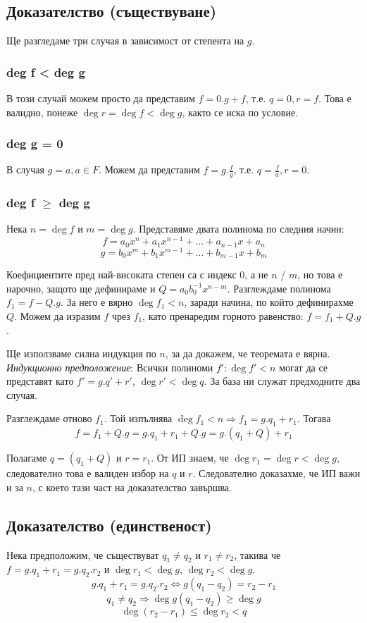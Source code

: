 \documentclass[fleqn,12pt]{article}
\begin{document}
\subsection{Доказателство (съществуване)}
Ще разгледаме три случая в зависимост от степента на $g$.

\subsubsection{deg f < deg g}
В този случай можем просто да представим $f = 0.g + f$, т.е. $q=0, r = f$.
Това е валидно, понеже $\deg r = \deg f < \deg g$, както се иска по условие.

\subsubsection{deg g = 0}
В случая $g = a, a \in F$. Можем да представим $f = g . \frac{f}{g}$, т.е. $q = \frac{f}{a}, r = 0$.

\subsubsection{deg f $\geq$ deg g}
Нека $n = \deg f$ и $m = \deg g$. Представяме двата полинома по следния начин:
\[ f = a_0 x^n + a_1 x^{n-1} + \dots + a_{n-1} x + a_n \]
\[ g = b_0 x^m + b_1 x^{m-1} + \dots + b_{m-1} x + b_m \]

Коефициентите пред най-високата степен са с индекс 0, а не $n$ / $m$, но това е нарочно, защото ще дефинираме и
$Q = a_0 b_0^{-1} x^{n-m}$. Разглеждаме полинома $f_1 = f - Q . g$. За него е вярно $\deg f_1 < n$, заради начина, по 
който дефинирахме $Q$. Можем да изразим $f$ чрез $f_1$, като пренаредим горното равенство: $f = f_1 + Q . g$.

Ще използваме силна индукция по $n$, за да докажем, че теоремата е вярна.
\textit{Индукционно предположение}: Всички полиноми $f' : \deg f' < n$ могат да се представят
като $f' = g . q' + r'$, $\deg r' < \deg q$. За база ни служат предходните два случая.

Разглеждаме отново $f_1$. Той изпълнява $\deg f_1 < n \Rightarrow f_1 = g . q_1 + r_1$.
Тогава 
\[f = f_1 + Q . g = g . q_1 + r_1 + Q . g = g . (q_1 + Q) + r_1 \]

Полагаме $q = (q_1 + Q)$ и $r = r_1$. От ИП знаем, че $\deg r_1 = \deg r < \deg g$, 
следователно това е валиден избор на $q$ и $r$. Следователно доказахме, че ИП важи и за $n$, с
което тази част на доказателство завършва. 

\subsection{Доказателство (единственост)}
Нека предположим, че съществуват $q_1 \neq q_2$ и $r_1 \neq r_2$, такива че 
$f = g . q_1 + r_1 = g . q_2 . r_2$ и $\deg r_1 < \deg g$, $\deg r_2 < \deg g$. 
\[ g . q_1 + r_1 = g . q_2 . r_2 \Leftrightarrow g(q_1 - q_2) = r_2 - r_1 \]
\[ q_1 \neq q_2 \Rightarrow \deg g(q_1 - q_2) \geq \deg g \]
\[ \deg (r_2 - r_1) \leq \deg r_2 < q \]
\end{document}
